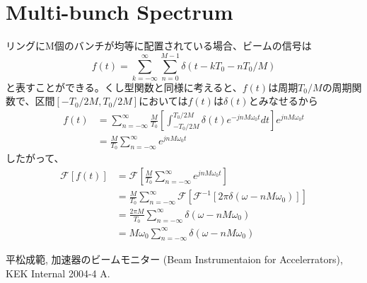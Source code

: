 \documentclass[]{jlreq}
\begin{document}
\section{Multi-bunch Spectrum}
リングにM個のバンチが均等に配置されている場合、ビームの信号は
%
\begin{equation}
  f(t) = \sum_{k=-\infty}^{\infty} \sum_{n=0}^{M-1}\delta (t - k T_0 -n T_0 / M)
\end{equation}
%
と表すことができる。くし型関数と同様に考えると、$f(t)$は周期$T_0/M$の周期関数で、区間$[-T_0/2M, T_0/2M]$においては$f(t)$は$\delta(t)$とみなせるから
%
%
\begin{align}
  f(t) &= \sum_{n = -\infty}^{\infty} \frac{M}{T_0} \left[\int_{-T_0/2M}^{T_0/2M}\delta (t) e^{-j n M \omega_0 t} dt\right] 
  e^{j n M \omega_0 t} \\
              &= \frac{M}{T_0} \sum_{n = -\infty}^{\infty} e^{j n M \omega_0 t} 
\end{align}
%
したがって、
%
\begin{align}
  \mathcal{F}[f(t)] &= \mathcal{F}\left[\frac{M}{T_0} \sum_{n = -\infty}^{\infty} e^{j n M \omega_0 t}\right] \\ 
      & = \frac{M}{T_0} \sum_{n = -\infty}^{\infty} \mathcal{F}[\mathcal{F}^{-1}[2\pi \delta(\omega - n M \omega_0)]] \\ 
      & = \frac{2 \pi M}{T_0} \sum_{n = -\infty}^{\infty} \delta(\omega - n M \omega_0)\\ 
      &= M \omega_0 \sum_{n = -\infty}^{\infty} \delta(\omega - n M \omega_0)
\end{align}
%
\begin{thebibliography}{9}
  平松成範, 加速器のビームモニター (Beam Instrumentaion for Accelerrators), KEK Internal 2004-4 A.
\end{thebibliography}
%
\end{document}

